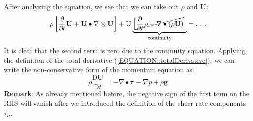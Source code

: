 \documentclass[MathematicsNumericsDerivationsAndOpenFOAM.tex]{subfiles}
\begin{document}
%
    After analyzing the equation, we see that we can take out $\rho$ and
    $\textbf{U}$:
%
%
\begin{equation}
   \rho \left[\frac{\partial}{\partial t} \textbf{U} + \textbf{U} \bullet \nabla \otimes \textbf{U}\right]
+
\textbf{U} \underbrace{\left[\cancel{\frac{\partial}{\partial t} \rho + \nabla \bullet (\rho\textbf{U})}\right]}_{\mathrm{continuity}}
=
   .~.~.
\end{equation}
%
%
    It is clear that the second term is zero due to the continuity equation.
    Applying the definition of the total derivative
    (\ref{EQUATION::totalDerivative}), we can write the non-conservative form of
    the momentum equation as:
%
%
\begin{equation}
  \rho \frac{\mathrm{D}\textbf{U}}{\mathrm{D}t}
=
    -   \nabla \bullet \boldsymbol \tau
    -   \nabla p
    + \rho\textbf{g}
\label{EQUATION::momentumDivNon}
\end{equation}
%
%
    \textbf{Remark}: As already mentioned before, the negative sign of the first
    term on the RHS will vanish after we introduced the definition of the
    shear-rate components $\tau_{ii}$.
%
%
%
%
%

\end{document}

